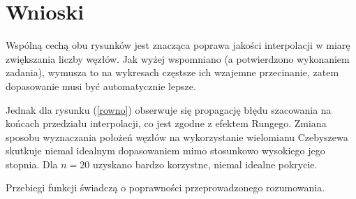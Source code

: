 \newpage
\section{Wnioski}
	
Wspólną cechą obu rysunków jest znacząca poprawa jakości interpolacji w miarę zwiększania liczby węzłów. Jak wyżej wspomniano (a potwierdzono wykonaniem zadania), wymusza to na wykresach częstsze ich wzajemne przecinanie, zatem dopasowanie musi być automatycznie lepsze.

Jednak dla rysunku (\ref{rowno}) obserwuje się propagację błędu szacowania na końcach przedziału interpolacji, co jest zgodne z efektem Rungego. Zmiana sposobu wyznaczania położeń węzłów na wykorzystanie wielomianu Czebyszewa skutkuje niemal idealnym dopasowaniem mimo stosunkowo wysokiego jego stopnia. Dla $ n = 20 $ uzyskano bardzo korzystne, niemal idealne pokrycie.

Przebiegi funkcji świadczą o poprawności przeprowadzonego rozumowania.
	
